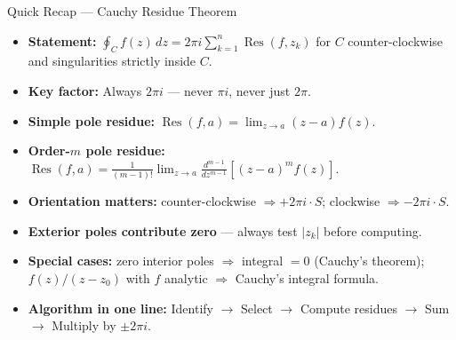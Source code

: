 \documentclass[12pt,a4paper]{article}
\begin{document}
\begin{learnbox}{Quick Recap --- Cauchy Residue Theorem}
\begin{itemize}[noitemsep]
  \item \textbf{Statement:} $\oint_C f(z)\,dz = 2\pi i \sum_{k=1}^{n}
        \operatorname{Res}(f,z_k)$ for $C$ counter-clockwise and singularities
        strictly inside $C$.
  \item \textbf{Key factor:} Always $2\pi i$ --- never $\pi i$, never just
        $2\pi$.
  \item \textbf{Simple pole residue:}
        $\operatorname{Res}(f,a) = \lim_{z\to a}(z-a)f(z)$.
  \item \textbf{Order-$m$ pole residue:}
        $\operatorname{Res}(f,a) = \frac{1}{(m-1)!}\lim_{z\to a}
        \frac{d^{m-1}}{dz^{m-1}}[(z-a)^m f(z)]$.
  \item \textbf{Orientation matters:} counter-clockwise $\Rightarrow +2\pi i
        \cdot S$; clockwise $\Rightarrow -2\pi i \cdot S$.
  \item \textbf{Exterior poles contribute zero} --- always test $|z_k|$ before
        computing.
  \item \textbf{Special cases:} zero interior poles $\Rightarrow$ integral $=0$
        (Cauchy's theorem); $f(z)/(z-z_0)$ with $f$ analytic $\Rightarrow$
        Cauchy's integral formula.
  \item \textbf{Algorithm in one line:} Identify $\to$ Select $\to$ Compute
        residues $\to$ Sum $\to$ Multiply by $\pm 2\pi i$.
\end{itemize}
\end{learnbox}
\end{document}
